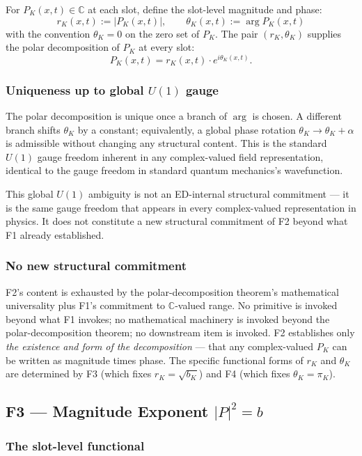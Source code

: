 \documentclass[11pt,a4paper]{article}
\begin{document}
For $P_K(x, t) \in \mathbb{C}$ at each slot, define the slot-level magnitude and phase:
\[
r_K(x, t) := |P_K(x, t)|, \qquad \theta_K(x, t) := \arg P_K(x, t)
\]
with the convention $\theta_K = 0$ on the zero set of $P_K$. The pair $(r_K, \theta_K)$ supplies the polar decomposition of $P_K$ at every slot:
\[
P_K(x, t) = r_K(x, t) \cdot e^{i \theta_K(x, t)}.
\]

\subsubsection{Uniqueness up to global $U(1)$ gauge}

The polar decomposition is unique once a branch of $\arg$ is chosen. A different branch shifts $\theta_K$ by a constant; equivalently, a global phase rotation $\theta_K \to \theta_K + \alpha$ is admissible without changing any structural content. This is the standard $U(1)$ gauge freedom inherent in any complex-valued field representation, identical to the gauge freedom in standard quantum mechanics's wavefunction.

This global $U(1)$ ambiguity is not an ED-internal structural commitment --- it is the same gauge freedom that appears in every complex-valued representation in physics. It does not constitute a new structural commitment of F2 beyond what F1 already established.

\subsubsection{No new structural commitment}

F2's content is exhausted by the polar-decomposition theorem's mathematical universality plus F1's commitment to $\mathbb{C}$-valued range. No primitive is invoked beyond what F1 invokes; no mathematical machinery is invoked beyond the polar-decomposition theorem; no downstream item is invoked. F2 establishes only \emph{the existence and form of the decomposition} --- that any complex-valued $P_K$ can be written as magnitude times phase. The specific functional forms of $r_K$ and $\theta_K$ are determined by F3 (which fixes $r_K = \sqrt{b_K}$) and F4 (which fixes $\theta_K = \pi_K$).

\subsection{F3 --- Magnitude Exponent $|P|^2 = b$}\label{sec:F3}

\subsubsection{The slot-level functional}
\end{document}
